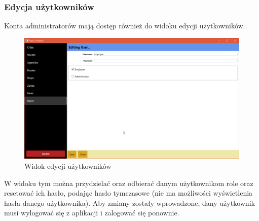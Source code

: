 \documentclass[10pt,a4paper]{article}
\begin{document}
\subsubsection{Edycja użytkowników}
Konta administratorów mają dostęp również do widoku edycji użytkowników.
\begin{figure}[H]
	\centering
	\includegraphics[width=15cm]{screenshots/19_edit_user.png}
	\caption{Widok edycji użytkowników}
\end{figure}
W widoku tym można przydzielać oraz odbierać danym użytkownikom role oraz resetować ich hasło, podając hasło tymczasowe (nie ma możliwości wyświetlenia hasła danego użytkownika). Aby zmiany zostały wprowadzone, dany użytkownik musi wylogować się z aplikacji i zalogować się ponownie.
\end{document}

